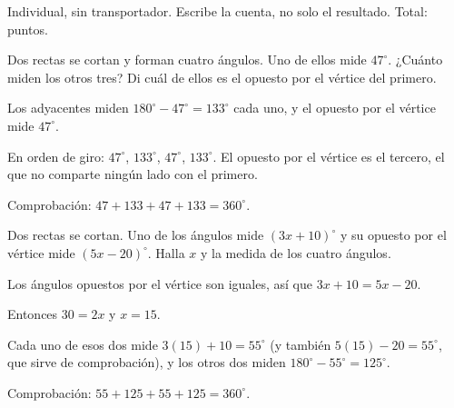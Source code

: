 \documentclass[11pt]{article}
\begin{document}
\encabezado

\begin{instrucciones}
Individual, sin transportador. Escribe la cuenta, no solo el resultado.
Total: \totalpuntos{} puntos.
\end{instrucciones}

\begin{preguntas}

\pregunta[2.5] Dos rectas se cortan y forman cuatro ángulos. Uno de ellos mide $47^\circ$.
¿Cuánto miden los otros tres? Di cuál de ellos es el opuesto por el vértice del primero.
\espacio{4cm}
\begin{solucion}
Los adyacentes miden $180^\circ - 47^\circ = 133^\circ$ cada uno, y el opuesto por el vértice
mide $47^\circ$.

En orden de giro: $47^\circ$, $133^\circ$, $47^\circ$, $133^\circ$. El opuesto por el vértice
es el tercero, el que no comparte ningún lado con el primero.

Comprobación: $47 + 133 + 47 + 133 = 360^\circ$.
\end{solucion}

\pregunta[2.5] Dos rectas se cortan. Uno de los ángulos mide $(3x + 10)^\circ$ y su opuesto
por el vértice mide $(5x - 20)^\circ$. Halla $x$ y la medida de los cuatro ángulos.
\espacio{5cm}
\begin{solucion}
Los ángulos opuestos por el vértice son iguales, así que $3x + 10 = 5x - 20$.

Entonces $30 = 2x$ y $x = 15$.

Cada uno de esos dos mide $3(15) + 10 = 55^\circ$ (y también $5(15) - 20 = 55^\circ$, que sirve
de comprobación), y los otros dos miden $180^\circ - 55^\circ = 125^\circ$.

Comprobación: $55 + 125 + 55 + 125 = 360^\circ$.
\end{solucion}

\end{preguntas}
\end{document}
